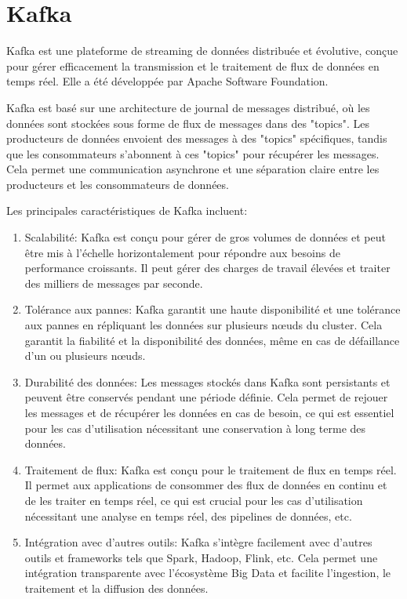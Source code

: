 \section{Kafka}

Kafka est une plateforme de streaming de données distribuée et évolutive, conçue pour gérer efficacement la transmission et le traitement de flux de données en temps réel. Elle a été développée par Apache Software Foundation.

Kafka est basé sur une architecture de journal de messages distribué, où les données sont stockées sous forme de flux de messages dans des "topics". Les producteurs de données envoient des messages à des "topics" spécifiques, tandis que les consommateurs s'abonnent à ces "topics" pour récupérer les messages. Cela permet une communication asynchrone et une séparation claire entre les producteurs et les consommateurs de données.

\cite{kafka}

Les principales caractéristiques de Kafka incluent:

\begin{enumerate}
	\item Scalabilité: Kafka est conçu pour gérer de gros volumes de données et peut être mis à l'échelle horizontalement pour répondre aux besoins de performance croissants. Il peut gérer des charges de travail élevées et traiter des milliers de messages par seconde.
	\item Tolérance aux pannes: Kafka garantit une haute disponibilité et une tolérance aux pannes en répliquant les données sur plusieurs nœuds du cluster. Cela garantit la fiabilité et la disponibilité des données, même en cas de défaillance d'un ou plusieurs nœuds.
	\item Durabilité des données: Les messages stockés dans Kafka sont persistants et peuvent être conservés pendant une période définie. Cela permet de rejouer les messages et de récupérer les données en cas de besoin, ce qui est essentiel pour les cas d'utilisation nécessitant une conservation à long terme des données.
	\item Traitement de flux: Kafka est conçu pour le traitement de flux en temps réel. Il permet aux applications de consommer des flux de données en continu et de les traiter en temps réel, ce qui est crucial pour les cas d'utilisation nécessitant une analyse en temps réel, des pipelines de données, etc.
	\item Intégration avec d'autres outils: Kafka s'intègre facilement avec d'autres outils et frameworks tels que Spark, Hadoop, Flink, etc. Cela permet une intégration transparente avec l'écosystème Big Data et facilite l'ingestion, le traitement et la diffusion des données.
\end{enumerate}

